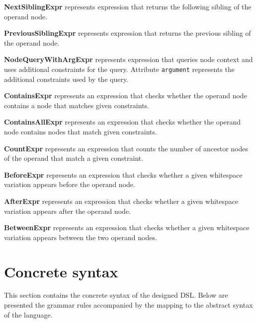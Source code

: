 \documentclass[parskip=full]{uvamscse}
\begin{document}
\begin{description}

\item\textbf{NextSiblingExpr} represents expression that returns the following sibling of the operand node.

\item\textbf{PreviousSiblingExpr} represents expression that returns the previous sibling of the operand node.

\item\textbf{NodeQueryWithArgExpr} represents expression that queries node context and uses additional constraints for the query. Attribute \texttt{argument} represents the additional constraints used by the query.

\item\textbf{ContainsExpr} represents an expression that checks whether the operand node contains a node that matches given constraints.

\item\textbf{ContainsAllExpr} represents an expression that checks whether the operand node contains nodes that match given constraints.

\item\textbf{CountExpr} represents an expression that counts the number of ancestor nodes of the operand that match a given constraint.

\item\textbf{BeforeExpr} represents an expression that checks whether a given whitespace variation appears before the operand node.

\item\textbf{AfterExpr} represents an expression that checks whether a given whitespace variation appears after the operand node.

\item\textbf{BetweenExpr} represents an expression that checks whether a given whitespace variation appears between the two operand nodes.

\end{description}

\section{Concrete syntax}

This section contains the concrete syntax of the designed DSL. Below are presented the grammar rules accompanied by the mapping to the abstract syntax of the language.
\end{document}
